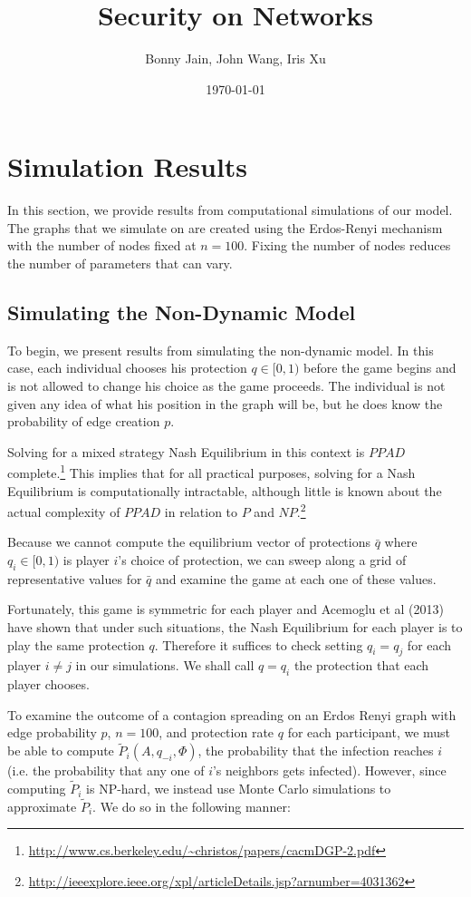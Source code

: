 \documentclass{article}
\title{Security on Networks}
\date{\today}
\author{Bonny Jain, John Wang, Iris Xu}
\theoremstyle{plain}
\begin{document}
  \maketitle

\section{Simulation Results}

In this section, we provide results from computational simulations of our model. The graphs that we simulate on are created using the Erdos-Renyi mechanism with the number of nodes fixed at $n = 100$. Fixing the number of nodes reduces the number of parameters that can vary.

\subsection{Simulating the Non-Dynamic Model}

To begin, we present results from simulating the non-dynamic model. In this case, each individual chooses his protection $q \in [0,1)$ before the game begins and is not allowed to change his choice as the game proceeds. The individual is not given any idea of what his position in the graph will be, but he does know the probability of edge creation $p$.

  Solving for a mixed strategy Nash Equilibrium in this context is $PPAD$ complete.\footnote{\url{http://www.cs.berkeley.edu/~christos/papers/cacmDGP-2.pdf}} This implies that for all practical purposes, solving for a Nash Equilibrium is computationally intractable, although little is known about the actual complexity of $PPAD$ in relation to $P$ and $NP$.\footnote{\url{http://ieeexplore.ieee.org/xpl/articleDetails.jsp?arnumber=4031362}} 

Because we cannot compute the equilibrium vector of protections $\bar{q}$ where $q_i \in [0,1)$ is player $i$'s choice of protection, we can sweep along a grid of representative values for $\bar{q}$ and examine the game at each one of these values.

Fortunately, this game is symmetric for each player and Acemoglu et al (2013) have shown that under such situations, the Nash Equilibrium for each player is to play the same protection $q$. Therefore it suffices to check setting $q_i = q_j$ for each player $i \neq j$ in our simulations. We shall call $q = q_i$ the protection that each player chooses.

To examine the outcome of a contagion spreading on an Erdos Renyi graph with edge probability $p$, $n = 100$, and protection rate $q$ for each participant, we must be able to compute $\tilde{P}_i(A, q_{-i}, \Phi)$, the probability that the infection reaches $i$ (i.e. the probability that any one of $i$'s neighbors gets infected). However, since computing $\tilde{P}_i$ is NP-hard, we instead use Monte Carlo simulations to approximate $\tilde{P}_i$. We do so in the following manner:
\end{document}
